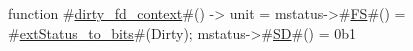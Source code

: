 function #\hyperref[sailRISCVzdirtyzyfdzycontext]{dirty\_fd\_context}#() -> unit = {
  mstatus->#\hyperref[sailRISCVzFS]{FS}#() = #\hyperref[sailRISCVzextStatuszytozybits]{extStatus\_to\_bits}#(Dirty);
  mstatus->#\hyperref[sailRISCVzSD]{SD}#() = 0b1
}
